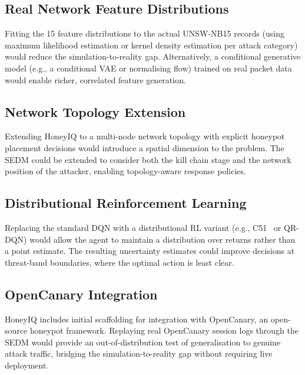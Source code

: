\subsection{Real Network Feature Distributions}

Fitting the 15 feature distributions to the actual UNSW-NB15 records
(using maximum likelihood estimation or kernel density estimation per
attack category) would reduce the simulation-to-reality gap.
Alternatively, a conditional generative model (e.g., a conditional VAE
or normalising flow) trained on real packet data would enable richer,
correlated feature generation.

\subsection{Network Topology Extension}

Extending HoneyIQ to a multi-node network topology with explicit honeypot
placement decisions would introduce a spatial dimension to the problem.
The SEDM could be extended to consider both the kill chain stage and the
network position of the attacker, enabling topology-aware response policies.

\subsection{Distributional Reinforcement Learning}

Replacing the standard DQN with a distributional RL variant
(e.g., C51~\citep{wang2016dueling} or QR-DQN) would allow the agent to
maintain a distribution over returns rather than a point estimate.
The resulting uncertainty estimates could improve decisions at threat-band
boundaries, where the optimal action is least clear.

\subsection{OpenCanary Integration}

HoneyIQ includes initial scaffolding for integration with OpenCanary,
an open-source honeypot framework.
Replaying real OpenCanary session logs through the SEDM would provide an
out-of-distribution test of generalisation to genuine attack traffic,
bridging the simulation-to-reality gap without requiring live deployment.
